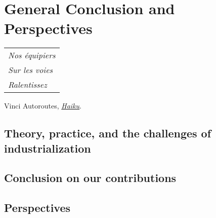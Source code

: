 
\chapter{General Conclusion and Perspectives}
\label{chapter:conclusion}

\begin{flushright}
	\begin{tabular}{@{}l@{}}
		\emph{Nos équipiers}\\
		\emph{\hspace*{1.0cm}Sur les voies}\\
		\emph{\hspace*{0.5cm}Ralentissez}\\
	\end{tabular}

	Vinci Autoroutes, \href{https://twitter.com/pooredward/status/1273249408231124994}{\emph{Haiku}}.
\end{flushright}


\section{Theory, practice, and the challenges of industrialization}
\section{Conclusion on our contributions}
\section{Perspectives}

